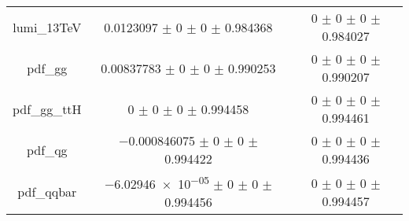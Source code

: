 \begin{table}
\begin{tabular}{ccc}
lumi\_13TeV & \num{0.0123097} $\pm$ \num{0} $\pm$ \num{0} $\pm$ \num{0.984368} & \num{0} $\pm$ \num{0} $\pm$ \num{0} $\pm$ \num{0.984027}\\
pdf\_gg & \num{0.00837783} $\pm$ \num{0} $\pm$ \num{0} $\pm$ \num{0.990253} & \num{0} $\pm$ \num{0} $\pm$ \num{0} $\pm$ \num{0.990207}\\
pdf\_gg\_ttH & \num{0} $\pm$ \num{0} $\pm$ \num{0} $\pm$ \num{0.994458} & \num{0} $\pm$ \num{0} $\pm$ \num{0} $\pm$ \num{0.994461}\\
pdf\_qg & \num{-0.000846075} $\pm$ \num{0} $\pm$ \num{0} $\pm$ \num{0.994422} & \num{0} $\pm$ \num{0} $\pm$ \num{0} $\pm$ \num{0.994436}\\
pdf\_qqbar & \num{-6.02946e-05} $\pm$ \num{0} $\pm$ \num{0} $\pm$ \num{0.994456} & \num{0} $\pm$ \num{0} $\pm$ \num{0} $\pm$ \num{0.994457}\\
\bottomrule
\end{tabular}
\end{table}